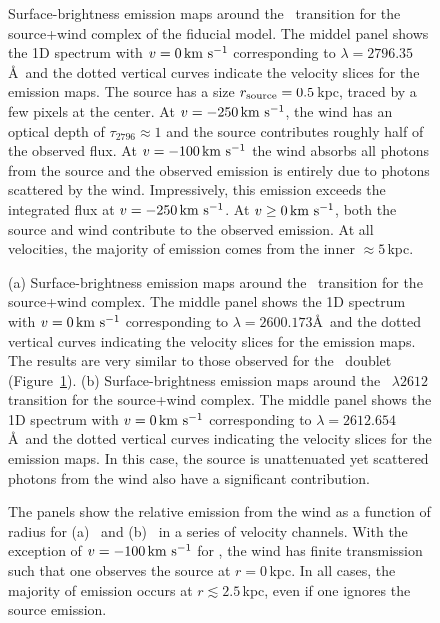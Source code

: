 \documentclass[12pt,preprint]{aastex}
\begin{document}
\begin{figure}
\caption{
Surface-brightness emission maps around the \mgiia\ transition for the
source+wind complex of the fiducial model.  The middel panel shows the 1D spectrum with $v=0
\, {\rm km~s^{-1}}$ corresponding to $\lambda = 2796.35$\AA\ and the dotted vertical
curves indicate the velocity slices for the emission maps.  The
source has a size $r_{\rm source} = 0.5$\,kpc, traced by a few
pixels at the center.   At $v=-250 \, {\rm km~s^{-1}}$, the wind has an optical
depth of $\tau_{2796} \approx 1$ and the source contributes
roughly half of the observed flux.  At $v=-100 \, {\rm km~s^{-1}}$ the
wind absorbs all photons from the source and the observed emission is
entirely due to photons scattered by the wind.  Impressively, this
emission exceeds the integrated flux at $v = -250\, {\rm km~s^{-1}}$. At $v \ge 0
\, {\rm km~s^{-1}}$,  both the source and wind contribute to the observed emission.
At all velocities, the majority of emission comes from the inner
$\approx 5$\,kpc.
}
\label{fig:fiducial_ifu_mgii}
\end{figure}

\begin{figure}
\caption{
(a) Surface-brightness emission maps around the \feiib\ transition for the
source+wind complex.  The middle panel shows the 1D spectrum with $v=0
\, {\rm km~s^{-1}}$ corresponding to $\lambda = 2600.173$\AA\ and the dotted vertical
curves indicating the velocity slices for the emission maps.  
The results are very similar to those observed for the \mgiid\ doublet
(Figure~\ref{fig:fiducial_ifu_mgii}).
(b) Surface-brightness emission maps around the ~$\lambda
2612$ transition for the 
source+wind complex.  The middle panel shows the 1D spectrum with $v=0
\, {\rm km~s^{-1}}$ corresponding to $\lambda = 2612.654$\AA\ and the dotted vertical
curves indicating the velocity slices for the emission maps.  
In this case, the source is unattenuated yet scattered photons from
the wind also have a significant contribution. 
}
\label{fig:fiducial_ifu_feii}
\end{figure}

\begin{figure}
\caption{
The panels show the relative emission from the wind as a function of
radius for (a) \mgiia\ and (b) \feiib\ in a series of velocity
channels.  With the exception of $v = -100 \, {\rm km~s^{-1}}$ for \mgiia, the wind
has finite transmission such that one observes the source at $r =
0$\,kpc.  In all cases,  the majority of emission occurs at $r
\lesssim 2.5$\,kpc, even if one ignores the source emission.
}
\label{fig:fiducial_cuts}
\end{figure}
\end{document}
